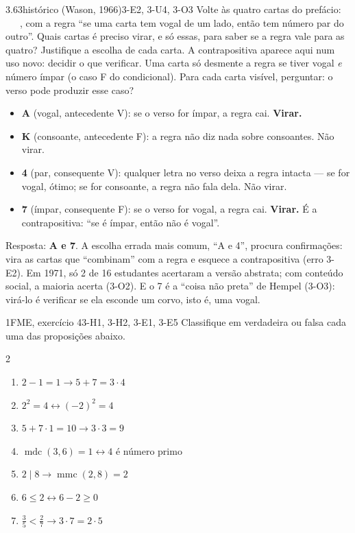 \begin{exemplo}{3.6}{3}{histórico (Wason, 1966)}{3-E2, 3-U4, 3-O3}\label{ex:3.6}
Volte às quatro cartas do prefácio: \ \ \ , com a regra \enquote{se uma carta tem vogal de um lado, então tem número par do outro}. Quais cartas é preciso virar, e só essas, para saber se a regra vale para as quatro? Justifique a escolha de cada carta.
\plano A contrapositiva aparece aqui num uso novo: decidir o que verificar. Uma carta só desmente a regra se tiver vogal \emph{e} número ímpar (o caso F do condicional). Para cada carta visível, perguntar: o verso pode produzir esse caso?
\resolucao
\begin{itemize}
  \item \textbf{A} (vogal, antecedente V): se o verso for ímpar, a regra cai. \textbf{Virar.}
  \item \textbf{K} (consoante, antecedente F): a regra não diz nada sobre consoantes. Não virar.
  \item \textbf{4} (par, consequente V): qualquer letra no verso deixa a regra intacta — se for vogal, ótimo; se for consoante, a regra não fala dela. Não virar.
  \item \textbf{7} (ímpar, consequente F): se o verso for vogal, a regra cai. \textbf{Virar.} É a contrapositiva: \enquote{se é ímpar, então não é vogal}.
\end{itemize}
Resposta: \textbf{A e 7}.
\comentario A escolha errada mais comum, \enquote{A e 4}, procura confirmações: vira as cartas que \enquote{combinam} com a regra e esquece a contrapositiva (erro 3-E2). Em 1971, só 2 de 16 estudantes acertaram a versão abstrata; com conteúdo social, a maioria acerta (3-O2). E o 7 é a \enquote{coisa não preta} de Hempel (3-O3): virá-lo é verificar se ela esconde um corvo, isto é, uma vogal.
\end{exemplo}

\Questoes

\begin{questao}{1}{FME, exercício 4}{3-H1, 3-H2, 3-E1, 3-E5}\label{u3:q1}
Classifique em verdadeira ou falsa cada uma das proposições abaixo.
\begin{multicols}{2}
\begin{enumerate}[label=\alph*)]
  \item $2-1=1\rightarrow 5+7=3\cdot4$
  \item $2^2=4\leftrightarrow(-2)^2=4$
  \item $5+7\cdot1=10\rightarrow 3\cdot3=9$
  \item $\operatorname{mdc}(3,6)=1\leftrightarrow 4$ é número primo
  \item $2\mid 8\rightarrow\operatorname{mmc}(2,8)=2$
  \item $6\le2\leftrightarrow 6-2\ge0$
  \item $\tfrac35<\tfrac27\rightarrow 3\cdot7=2\cdot5$
\end{enumerate}
\end{multicols}
\end{questao}

